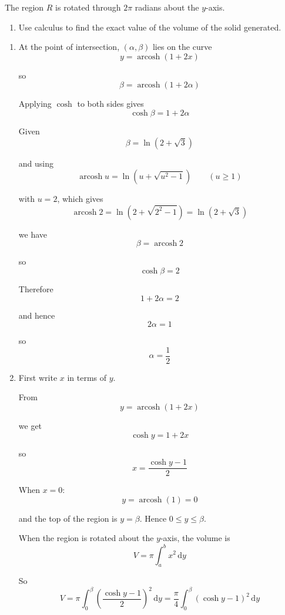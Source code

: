 \documentclass[leqno]{article}
\begin{document}
\begin{enumerate}[
  label=\textbf{\arabic*.},
  leftmargin=*,
  topsep=0pt,
  partopsep=0pt,
  parsep=0pt
]
  The region $R$ is rotated through $2\pi$ radians about the $y$-axis. \\
\begin{enumerate}[label=\textbf{(\alph*)}, resume]
\item Use calculus to find the exact value of the volume of the solid generated.  \\
\end{enumerate}

\vspace*{10pt}

\begin{djsSolution}
\begin{enumerate}[label=\textbf{(\alph*)}]
  \item At the point of intersection, $(\alpha,\beta)$ lies on the curve
\[
y=\operatorname{arcosh}(1+2x)
\]

so
\[
\beta=\operatorname{arcosh}(1+2\alpha)
\]

Applying $\cosh$ to both sides gives
\[
\cosh\beta=1+2\alpha
\]

Given
\[
\beta=\ln(2+\sqrt3)
\]

and using
\[
\operatorname{arcosh}u=\ln\left(u+\sqrt{u^2-1}\right)\qquad (u\ge 1)
\]

with $u=2$, which gives
\[
\operatorname{arcosh}2=\ln(2+\sqrt{2^2-1})=\ln(2+\sqrt3)
\]

we have
\[
\beta=\operatorname{arcosh}2
\]

so
\[
\cosh\beta=2
\]

Therefore
\[
1+2\alpha=2
\]

and hence
\[
2\alpha=1
\]

so
\[
\alpha=\frac12
\]

  \item First write $x$ in terms of $y$.

From
\[
y=\operatorname{arcosh}(1+2x)
\]

we get
\[
\cosh y=1+2x
\]

so
\[
x=\frac{\cosh y-1}{2}
\]

When $x=0$:
\[
y=\operatorname{arcosh}(1)=0
\]

and the top of the region is $y=\beta$. Hence $0\le y\le \beta$.

When the region is rotated about the $y$-axis, the volume is
\[
V=\pi\int_a^b x^2\,\mathrm{d}y
\]

So
\[
V=\pi\int_0^\beta \left(\frac{\cosh y-1}{2}\right)^2\,\mathrm{d}y
=\frac{\pi}{4}\int_0^\beta (\cosh y-1)^2\,\mathrm{d}y
\]


\end{enumerate}
\end{djsSolution}
\end{enumerate}
\end{document}

